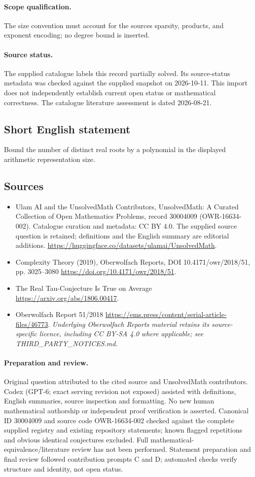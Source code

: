 \documentclass[11pt]{article}
\begin{document}
\paragraph{Scope qualification.}
The size convention must account for the source\textquotesingle s sparsity, products, and exponent encoding; no degree bound is inserted.
\paragraph{Source status.}
The supplied catalogue labels this record partially solved. Its source-status metadata was checked against the supplied snapshot on 2026-10-11. This import does not independently establish current open status or mathematical correctness. The catalogue literature assessment is dated 2026-08-21.
\subsection{Short English statement}
Bound the number of distinct real roots by a polynomial in the displayed arithmetic representation size.
\subsection{Sources}
\begin{itemize}
\item[S1] Ulam AI and the UnsolvedMath Contributors, UnsolvedMath: A Curated Collection of Open Mathematics Problems, record 30004009 (OWR-16634-002). Catalogue curation and metadata: CC BY 4.0. The supplied source question is retained; definitions and the English summary are editorial additions.
\url{https://huggingface.co/datasets/ulamai/UnsolvedMath}.
\item[S2] Complexity Theory (2019), Oberwolfach Reports, DOI 10.4171/owr/2018/51, pp. 3025--3080
\url{https://doi.org/10.4171/owr/2018/51}.
\item[S3] The Real Tau-Conjecture Is True on Average
\url{https://arxiv.org/abs/1806.00417}.
\item[S4] Oberwolfach Report 51/2018
\url{https://ems.press/content/serial-article-files/46773}.
\textit{Underlying Oberwolfach Reports material retains its source-specific licence, including CC BY-SA 4.0 where applicable; see THIRD\_PARTY\_NOTICES.md.}
\end{itemize}
\paragraph{Preparation and review.}
Original question attributed to the cited source and UnsolvedMath contributors. Codex (GPT-6; exact serving revision not exposed) assisted with definitions, English summaries, source inspection and formatting. No new human mathematical authorship or independent proof verification is asserted. Canonical ID 30004009 and source code OWR-16634-002 checked against the complete supplied registry and existing repository statements; known flagged repetitions and obvious identical conjectures excluded. Full mathematical-equivalence/literature review has not been performed. Statement preparation and final review followed contribution prompts C and D; automated checks verify structure and identity, not open status.
\label{end:30004009}
\end{document}
